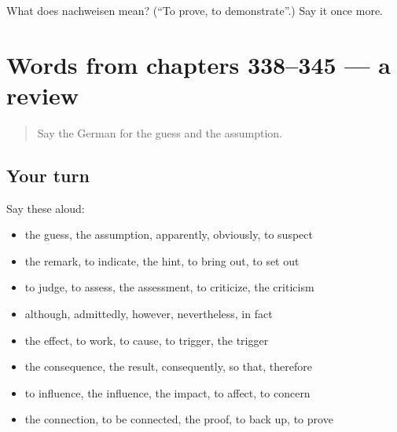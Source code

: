 \begin{tcolorbox}[breakable,colback=teal!4,colframe=teal!35!black,title={Before you move on}]
What does nachweisen mean? (\textquotedblleft{}To prove, to demonstrate\textquotedblright{}.) Say it once more.
\end{tcolorbox}
\section[(dialogue)]{Words from chapters 338–345 — a review}

\label{lesson:GE-R345-review-338-345}



\begin{quote}
Say the German for the guess and the assumption.
\end{quote}

\subsection*{Your turn}
Say these aloud:

\begin{itemize}
\raggedright
  \item the guess, the assumption, apparently, obviously, to suspect
  \item the remark, to indicate, the hint, to bring out, to set out
  \item to judge, to assess, the assessment, to criticize, the criticism
  \item although, admittedly, however, nevertheless, in fact
  \item the effect, to work, to cause, to trigger, the trigger
  \item the consequence, the result, consequently, so that, therefore
  \item to influence, the influence, the impact, to affect, to concern
  \item the connection, to be connected, the proof, to back up, to prove
\end{itemize}


